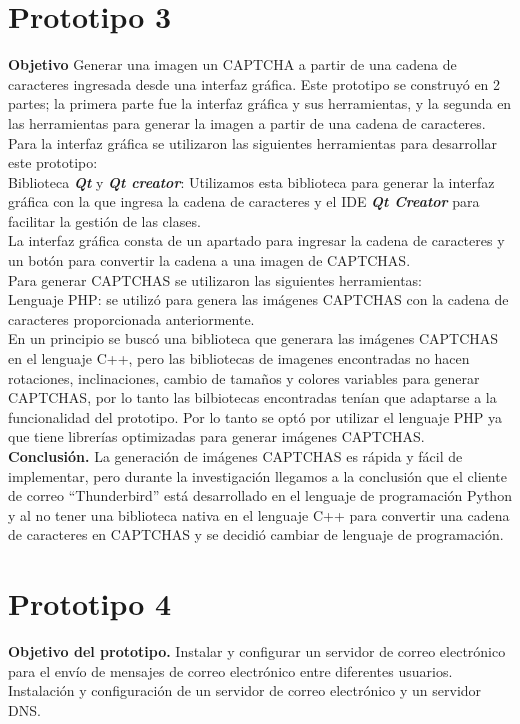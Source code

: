 \section{Prototipo 3}
\textbf{Objetivo}
Generar una imagen un CAPTCHA a partir de una cadena de caracteres ingresada desde una interfaz gráfica.
Este prototipo se construyó en 2 partes; la primera parte fue la interfaz gráfica y sus herramientas, y la segunda en las herramientas para generar la imagen a partir de una cadena de caracteres.\\
Para la interfaz gráfica se utilizaron las siguientes herramientas para desarrollar este prototipo:\\
Biblioteca \textbf{\textit{Qt}} y \textbf{\textit{Qt creator}}: Utilizamos esta biblioteca para generar la interfaz gráfica con la que ingresa la cadena de caracteres y el IDE \textbf{\textit{Qt Creator}} para facilitar la gestión de las clases.\\
La interfaz gráfica consta de un apartado para ingresar la cadena de caracteres y un botón para convertir la cadena a una imagen de CAPTCHAS.\\
Para generar CAPTCHAS se utilizaron las siguientes herramientas:\\
Lenguaje PHP: se utilizó para genera las imágenes CAPTCHAS con la cadena de caracteres proporcionada anteriormente.\\
En un principio se buscó una biblioteca que generara las imágenes CAPTCHAS en el lenguaje C++, pero las bibliotecas de imagenes encontradas no hacen rotaciones, inclinaciones, cambio de tamaños y colores variables para generar CAPTCHAS, por lo tanto las bilbiotecas encontradas tenían que adaptarse a la funcionalidad del prototipo. Por lo tanto se optó por utilizar el lenguaje PHP ya que tiene librerías optimizadas para generar imágenes CAPTCHAS.\\
\textbf{Conclusión.}
La generación de imágenes CAPTCHAS es rápida y fácil de implementar, pero durante la investigación llegamos a la conclusión que el cliente de correo “Thunderbird” está desarrollado en el lenguaje de programación Python y al no tener una biblioteca nativa en el lenguaje C++ para convertir una cadena de caracteres en CAPTCHAS y  se decidió cambiar de lenguaje de programación.\\



\section{Prototipo 4}
\textbf{Objetivo del prototipo.}
Instalar y configurar un servidor de correo electrónico para el envío de mensajes de correo electrónico entre diferentes usuarios.\\
Instalación y configuración de un servidor de correo electrónico y un servidor DNS.\\


